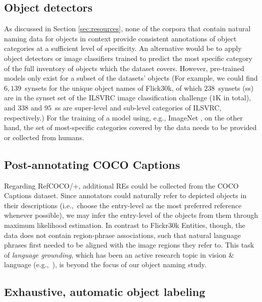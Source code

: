 \documentclass[runningheads]{llncs}
\newcommand{\refcoco}{RefCOCO\xspace}
\newcommand{\flickr}{Flickr30k Entities\xspace}
\begin{document}
\subsection{Object detectors}
As discussed in Section \ref{sec:resources}, none of the corpora that contain natural naming data for objects in context provide consistent annotations of object categories at a sufficient level of specificity.
An alternative would be to apply object detectors or image classifiers trained to predict the most specific category of the full inventory of objects which the dataset covers. 
However, pre-trained models only exist for a subset of the datasets' objects  (For example, we could find $6,139$~synsets for the unique object names of Flick30k, of which $238$~synsets (ss) are in the synset set of the ILSVRC image classification challenge ($1$K in total), and $338$ and $95$~ss are super-level and sub-level categories of ILSVRC, respectively.)
For the training of a model using, e.g., ImageNet \cite{imagenet_cvpr09}, on the other hand, the  set of most-specific categories covered by the data needs to be provided or collected from humans. 

\subsection{Post-annotating COCO Captions}
Regarding \refcoco/+, additional REs could be collected from the COCO Captions dataset. %
Since annotators could naturally refer to depicted objects in their descriptions (i.e.,~choose the entry-level as the most preferred reference whenever possible), we may infer the entry-level of the objects from them through maximum likelihood estimation. 
%
In contrast to \flickr, though, the data does not contain region-phrase associations,  %
such that natural language phrases first needed to be aligned with the image regions they refer to. 
This task of \textit{language grounding}, which has been an active research topic in vision \& language (e.g.,~\cite{kong2014what,karpathy2015deep,rohrbach2016grounding}), is beyond the focus of our object naming study. 

\subsection{Exhaustive, automatic object labeling}
\end{document}
